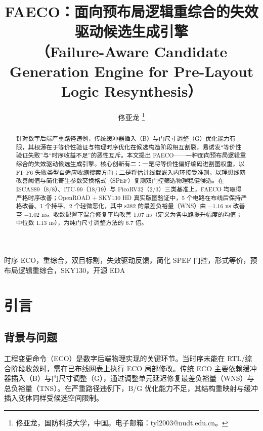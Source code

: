 \documentclass[journal]{IEEEtran}
\title{FAECO：面向预布局逻辑重综合的失效驱动候选生成引擎\\
（Failure-Aware Candidate Generation Engine for Pre-Layout Logic Resynthesis）}
\author{佟亚龙%
\thanks{佟亚龙，国防科技大学，中国。电子邮箱：tyl2003@nudt.edu.cn。}}
\begin{document}
\maketitle

\sloppy

\begin{abstract}
针对数字后端严重路径违例，传统缓冲器插入（B）与门尺寸调整（G）优化能力有限，其根源在于等价性验证与物理时序优化在候选构造阶段相互割裂，易诱发“等价性验证失败”与“时序收益不足”的恶性互斥。本文提出 FAECO——一种面向预布局逻辑重综合的失效驱动候选生成引擎。核心创新有二：一是将等价性偏好编码进割图权重，以 F1--F6 失败类型自适应收缩搜索方向；二是将估计线载嵌入内环接受准则，以理想线网改善阈值与简化寄生参数交换格式（SPEF）复测双门控筛选物理稳健候选。在 ISCAS89（8/8）、ITC-99（18/19）与 PicoRV32（2/3）三类基准上，FAECO 均取得严格时序改善；OpenROAD + SKY130 HD 真实版图验证中，5 个电路在布线后保持严格改善、1 个持平、2 个轻微恶化，其中 s382 的最差负裕量（WNS）由 $-1.16$ ns 改善至 $-1.02$ ns。收敛配置下混合修复平均改善 1.07 ns（定义为各电路提升幅度的均值；中位数 1.13 ns），为纯门尺寸调整方法的 6.7 倍。
\end{abstract}

\begin{IEEEkeywords}
时序 ECO，重综合，双目标割，失效驱动反馈，简化 SPEF 门控，形式等价，预布局逻辑重综合，SKY130，开源 EDA
\end{IEEEkeywords}

\section{引言}

\subsection{背景与问题}

工程变更命令（ECO）是数字后端物理实现的关键环节。当时序未能在 RTL/综合阶段收敛时，需在已布线网表上执行 ECO 局部修改。传统 ECO 主要依赖缓冲器插入（B）与门尺寸调整（G），通过调整单元延迟修复最差负裕量（WNS）与总负裕量（TNS）。在严重路径违例下，B/G 优化能力不足，其结构重映射与缓冲插入变体同样受候选空间限制\cite{chen2012metal,chen2012fixability,liang2012buffer,ho2010eco}。
\end{document}
